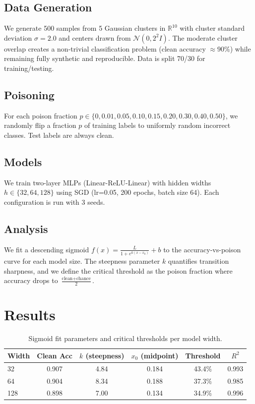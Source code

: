 \documentclass[11pt,a4paper]{article}
\begin{document}
\subsection{Data Generation}
We generate 500 samples from 5 Gaussian clusters in $\mathbb{R}^{10}$ with cluster standard deviation $\sigma = 2.0$ and centers drawn from $\mathcal{N}(0, 2^2 I)$. The moderate cluster overlap creates a non-trivial classification problem (clean accuracy $\approx 90\%$) while remaining fully synthetic and reproducible. Data is split 70/30 for training/testing.

\subsection{Poisoning}
For each poison fraction $p \in \{0, 0.01, 0.05, 0.10, 0.15, 0.20, 0.30, 0.40, 0.50\}$, we randomly flip a fraction $p$ of training labels to uniformly random incorrect classes. Test labels are always clean.

\subsection{Models}
We train two-layer MLPs (Linear-ReLU-Linear) with hidden widths $h \in \{32, 64, 128\}$ using SGD (lr=0.05, 200 epochs, batch size 64). Each configuration is run with 3 seeds.

\subsection{Analysis}
We fit a descending sigmoid $f(x) = \frac{L}{1 + e^{k(x - x_0)}} + b$ to the accuracy-vs-poison curve for each model size. The steepness parameter $k$ quantifies transition sharpness, and we define the critical threshold as the poison fraction where accuracy drops to $\frac{\text{clean} + \text{chance}}{2}$.

\section{Results}

\begin{table}[h]
\centering
\caption{Sigmoid fit parameters and critical thresholds per model width.}
\label{tab:fits}
\begin{tabular}{@{}lccccc@{}}
\toprule
Width & Clean Acc & $k$ (steepness) & $x_0$ (midpoint) & Threshold & $R^2$ \\
\midrule
32  & 0.907 & 4.84  & 0.184 & 43.4\% & 0.993 \\
64  & 0.904 & 8.34  & 0.188 & 37.3\% & 0.985 \\
128 & 0.898 & 7.00  & 0.134 & 34.9\% & 0.996 \\
\bottomrule
\end{tabular}
\end{table}
\end{document}
